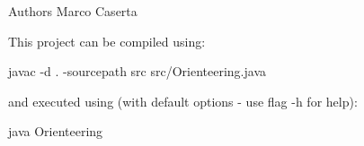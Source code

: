 \begin{DoxyAuthor}{Authors}
Marco Caserta
\end{DoxyAuthor}
This project can be compiled using\+: 
\begin{DoxyCode}
javac -d . -sourcepath src src/Orienteering.java
\end{DoxyCode}
 and executed using (with default options -\/ use flag -\/h for help)\+: 
\begin{DoxyCode}
java Orienteering
\end{DoxyCode}
 